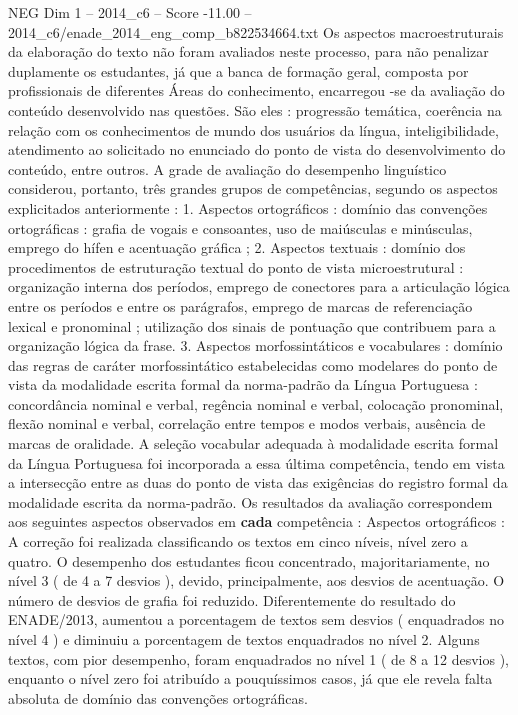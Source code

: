 \begin{textsample}{NEG Dim 1 – 2014\_c6 – Score -11.00 – 2014\_c6/enade\_2014\_eng\_comp\_b822534664.txt}
Os aspectos macroestruturais da elaboração do texto não foram avaliados neste processo, para não penalizar duplamente os estudantes, já que a banca de formação geral, composta por profissionais de diferentes Áreas do conhecimento, encarregou -se da avaliação do conteúdo desenvolvido nas questões.
São eles : progressão temática, coerência na relação com os conhecimentos de mundo dos usuários da língua, inteligibilidade, atendimento ao solicitado no enunciado do ponto de vista do desenvolvimento do conteúdo, entre outros.
A grade de avaliação do desempenho linguístico considerou, portanto, três grandes grupos de competências, segundo os aspectos explicitados anteriormente : 1.
Aspectos ortográficos : domínio das convenções ortográficas : grafia de vogais e consoantes, uso de maiúsculas e minúsculas, emprego do hífen e acentuação gráfica ; 2.
Aspectos textuais : domínio dos procedimentos de estruturação textual do ponto de vista microestrutural : organização interna dos períodos, emprego de conectores para a articulação lógica entre os períodos e entre os parágrafos, emprego de marcas de referenciação lexical e pronominal ; utilização dos sinais de pontuação que contribuem para a organização lógica da frase. 3.
Aspectos morfossintáticos e vocabulares : domínio das regras de caráter morfossintático estabelecidas como modelares do ponto de vista da modalidade escrita formal da norma-padrão da Língua Portuguesa : concordância nominal e verbal, regência nominal e verbal, colocação pronominal, flexão nominal e verbal, correlação entre tempos e modos verbais, ausência de marcas de oralidade.
A seleção vocabular adequada à modalidade escrita formal da Língua Portuguesa foi incorporada a essa última competência, tendo em vista a intersecção entre as duas do ponto de vista das exigências do registro formal da modalidade escrita da norma-padrão.
Os resultados da avaliação correspondem aos seguintes aspectos observados em \textbf{cada} competência : Aspectos ortográficos : A correção foi realizada classificando os textos em cinco níveis, nível zero a quatro.
O desempenho dos estudantes ficou concentrado, majoritariamente, no nível 3 ( de 4 a 7 desvios ), devido, principalmente, aos desvios de acentuação.
O número de desvios de grafia foi reduzido.
Diferentemente do resultado do ENADE/2013, aumentou a porcentagem de textos sem desvios ( enquadrados no nível 4 ) e diminuiu a porcentagem de textos enquadrados no nível 2.
Alguns textos, com pior desempenho, foram enquadrados no nível 1 ( de 8 a 12 desvios ), enquanto o nível zero foi atribuído a pouquíssimos casos, já que ele revela falta absoluta de domínio das convenções ortográficas.

\end{textsample}
